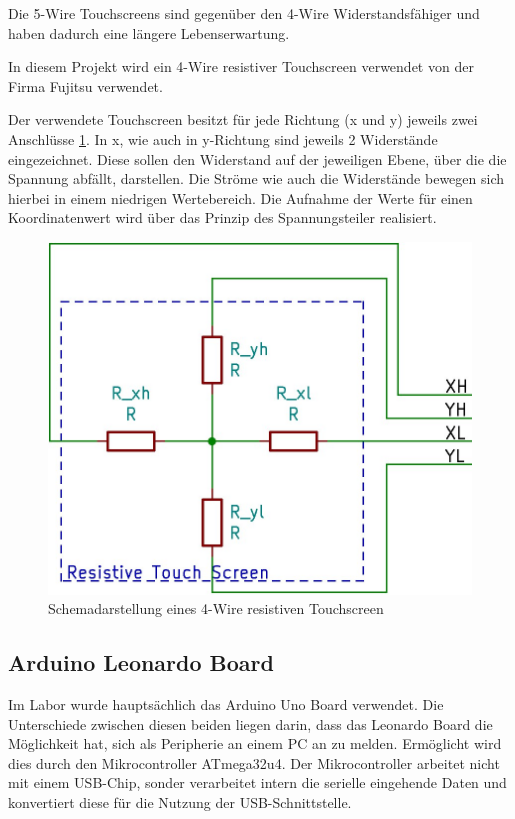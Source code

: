 Die 5-Wire Touchscreens sind gegenüber den 4-Wire Widerstandsfähiger und haben dadurch eine längere Lebenserwartung.\cite{5w4w}

In diesem Projekt wird ein 4-Wire resistiver Touchscreen verwendet von der Firma Fujitsu verwendet.

Der verwendete Touchscreen besitzt für jede Richtung (x und y) jeweils zwei Anschlüsse \cref{fig:4w}.
In x, wie auch in y-Richtung sind jeweils 2 Widerstände eingezeichnet.
Diese sollen den Widerstand auf der jeweiligen Ebene, über die die Spannung abfällt, darstellen.
Die Ströme wie auch die Widerstände bewegen sich hierbei in einem niedrigen Wertebereich.
Die Aufnahme der Werte für einen Koordinatenwert wird über das Prinzip des Spannungsteiler realisiert.
\begin{figure}
    \centering
    \includegraphics[width=0.6\linewidth]{fig/4-wire.jpg}
    \caption{Schemadarstellung eines 4-Wire resistiven Touchscreen}
    \label{fig:4w}
\end{figure}
\subsection{Arduino Leonardo Board}
Im Labor wurde hauptsächlich das Arduino Uno Board verwendet.
Die Unterschiede zwischen diesen beiden liegen darin, dass das Leonardo Board die Möglichkeit hat, sich als Peripherie an einem PC an zu melden.
Ermöglicht wird dies durch den Mikrocontroller ATmega32u4.
Der Mikrocontroller arbeitet nicht mit einem USB-Chip, sonder verarbeitet intern die serielle eingehende Daten und konvertiert diese für die Nutzung der USB-Schnittstelle.

